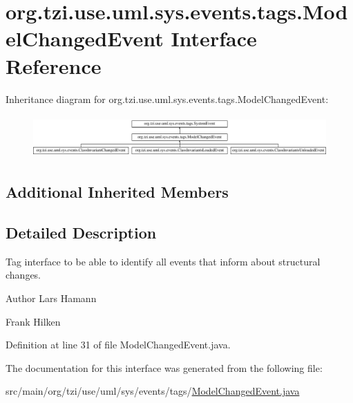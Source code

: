 \hypertarget{interfaceorg_1_1tzi_1_1use_1_1uml_1_1sys_1_1events_1_1tags_1_1_model_changed_event}{\section{org.\-tzi.\-use.\-uml.\-sys.\-events.\-tags.\-Model\-Changed\-Event Interface Reference}
\label{interfaceorg_1_1tzi_1_1use_1_1uml_1_1sys_1_1events_1_1tags_1_1_model_changed_event}
}
Inheritance diagram for org.\-tzi.\-use.\-uml.\-sys.\-events.\-tags.\-Model\-Changed\-Event\-:\begin{figure}[H]
\begin{center}
\leavevmode
\includegraphics[height=1.642229cm]{interfaceorg_1_1tzi_1_1use_1_1uml_1_1sys_1_1events_1_1tags_1_1_model_changed_event}
\end{center}
\end{figure}
\subsection*{Additional Inherited Members}


\subsection{Detailed Description}
Tag interface to be able to identify all events that inform about structural changes.

\begin{DoxyAuthor}{Author}
Lars Hamann 

Frank Hilken 
\end{DoxyAuthor}


Definition at line 31 of file Model\-Changed\-Event.\-java.



The documentation for this interface was generated from the following file\-:\begin{DoxyCompactItemize}
\item 
src/main/org/tzi/use/uml/sys/events/tags/\hyperlink{_model_changed_event_8java}{Model\-Changed\-Event.\-java}\end{DoxyCompactItemize}
